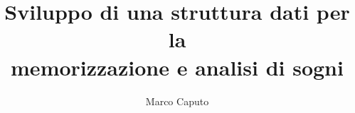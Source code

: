 \documentclass{unicam_thesis}
\title{Sviluppo di una struttura dati per la\\memorizzazione e analisi di sogni}
\author{Marco Caputo}%
\theoremstyle{definition}
\theoremstyle{proposition}
\begin{document}
\maketitle

\tableofcontents
\lstlistoflistings
\listoffigures
\listoftables





%


\appendix
%
%
%


\printbibliography

\printindex

%
\end{document}
